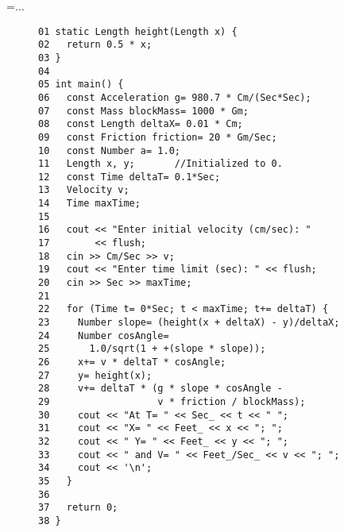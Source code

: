 {\newpage
\clearpage
\samepage \setbox\sizebox=\hbox{$\ldots$}\box\sizebox
}

{\newpage
\clearpage
\samepage \begin{figure}{\footnotesize
\begin{verbatim}01 static Length height(Length x) {
02   return 0.5 * x;
03 }
04 
05 int main() {
06   const Acceleration g= 980.7 * Cm/(Sec*Sec);
07   const Mass blockMass= 1000 * Gm;
08   const Length deltaX= 0.01 * Cm;
09   const Friction friction= 20 * Gm/Sec;
10   const Number a= 1.0;
11   Length x, y;       //Initialized to 0.
12   const Time deltaT= 0.1*Sec;
13   Velocity v;
14   Time maxTime;
15 
16   cout << "Enter initial velocity (cm/sec): " 
17        << flush;
18   cin >> Cm/Sec >> v;
19   cout << "Enter time limit (sec): " << flush;
20   cin >> Sec >> maxTime;
21 
22   for (Time t= 0*Sec; t < maxTime; t+= deltaT) {
23     Number slope= (height(x + deltaX) - y)/deltaX;
24     Number cosAngle= 
25       1.0/sqrt(1 + +(slope * slope));
26     x+= v * deltaT * cosAngle;
27     y= height(x);
28     v+= deltaT * (g * slope * cosAngle - 
29                   v * friction / blockMass);
30     cout << "At T= " << Sec_ << t << " ";
31     cout << "X= " << Feet_ << x << "; ";
32     cout << " Y= " << Feet_ << y << "; ";
33     cout << " and V= " << Feet_/Sec_ << v << "; ";
34     cout << '\n';
35   }
36 
37   return 0;
38 }\end{verbatim}
}


\label{Fig:Code}
\end{figure}
}



